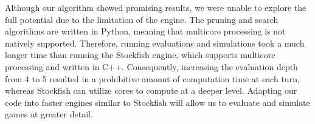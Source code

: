 \documentclass[letterpaper]{article}
\begin{document}
Although our algorithm showed promising results, we were unable to explore the full potential due to the limitation of the engine. The pruning and search algorithms are written in Python, meaning that multicore processing is not natively supported. Therefore, running evaluations and simulations took a much longer time than running the Stockfish engine, which supports multicore processing and written in C++. Consequently, increasing the evaluation depth from 4 to 5 resulted in a prohibitive amount of computation time at each turn, whereas Stockfish can utilize cores to compute at a deeper level. Adapting our code into faster engines similar to Stockfish will allow us to evaluate and simulate games at greater detail. 



\end{document}
